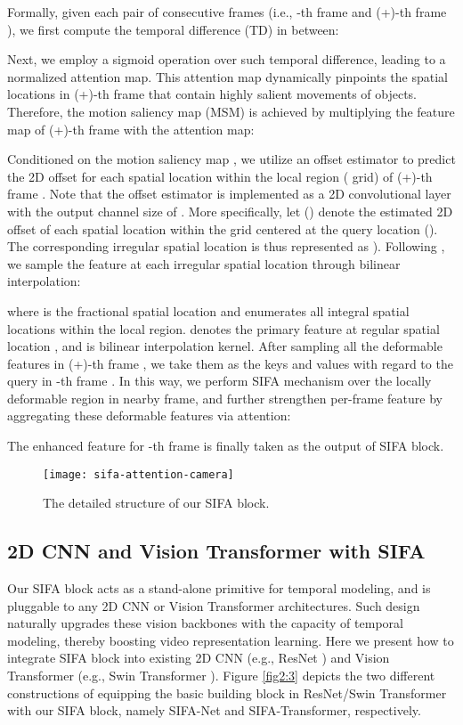 \documentclass[10pt,twocolumn,letterpaper]{article}
\begin{document}
Formally, given each pair of consecutive frames (i.e., -th frame  and (+)-th frame ), we first compute the temporal difference (TD) in between:

Next, we employ a sigmoid operation over such temporal difference, leading to a normalized attention map. This attention map dynamically pinpoints the spatial locations in (+)-th frame that contain highly salient movements of objects. Therefore, the motion saliency map (MSM)  is achieved by multiplying the feature map of (+)-th frame  with the attention map:

Conditioned on the motion saliency map , we utilize an offset estimator to predict the 2D offset for each spatial location within the local region ( grid) of (+)-th frame . Note that the offset estimator is implemented as a 2D convolutional layer with the output channel size of . More specifically, let () denote the estimated 2D offset of each spatial location  within the  grid centered at the query location ().
The corresponding irregular spatial location is thus represented as ).
Following \cite{Dai:ICCV17}, we sample the feature  at each irregular spatial location  through bilinear interpolation:

where  is the fractional spatial location and  enumerates all integral spatial locations within the local region.  denotes the primary feature at regular spatial location , and  is bilinear interpolation kernel.
After sampling all the  deformable features in (+)-th frame , we take them as the keys  and values  with regard to the query  in -th frame . In this way, we perform SIFA mechanism over the locally deformable region in nearby frame, and further strengthen per-frame feature by aggregating these deformable features via attention:

The enhanced feature  for -th frame is finally taken as the output of SIFA block.

\begin{figure}[!tb]
      \centering
      {\texttt{[image: sifa-attention-camera]}}
      \vspace{-0.16in}
      \caption{\small The detailed structure of our SIFA block.}
      \label{fig2:2}
      \vspace{-0.25in}
\end{figure}

\subsection{2D CNN and Vision Transformer with SIFA}
Our SIFA block acts as a stand-alone primitive for temporal modeling, and is pluggable to any 2D CNN or Vision Transformer architectures. Such design naturally upgrades these vision backbones with the capacity of temporal modeling, thereby boosting video representation learning. Here we present how to integrate SIFA block into existing 2D CNN (e.g., ResNet \cite{Kaiming:CVPR16}) and Vision Transformer (e.g., Swin Transformer \cite{Swin-ViT}). Figure \ref{fig2:3} depicts the two different constructions of equipping the basic building block in ResNet/Swin Transformer with our SIFA block, namely SIFA-Net and SIFA-Transformer, respectively.
\end{document}
